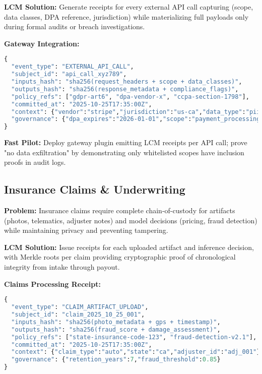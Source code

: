 \documentclass[12pt,a4paper]{article}
\begin{document}
\textbf{LCM Solution:} Generate receipts for every external API call capturing (scope, data classes, DPA reference, jurisdiction) while materializing full payloads only during formal audits or breach investigations.

\begin{technicalbox}
\textbf{Gateway Integration:}
\begin{lstlisting}[language=Python, caption=API Compliance Receipt]
{
  "event_type": "EXTERNAL_API_CALL",
  "subject_id": "api_call_xyz789",
  "inputs_hash": "sha256(request_headers + scope + data_classes)",
  "outputs_hash": "sha256(response_metadata + compliance_flags)",
  "policy_refs": ["gdpr-art6", "dpa-vendor-x", "ccpa-section-1798"],
  "committed_at": "2025-10-25T17:35:00Z",
  "context": {"vendor":"stripe","jurisdiction":"us-ca","data_type":"pii"},
  "governance": {"dpa_expires":"2026-01-01","scope":"payment_processing"}
}
\end{lstlisting}
\end{technicalbox}

\textbf{Fast Pilot:} Deploy gateway plugin emitting LCM receipts per API call; prove "no data exfiltration" by demonstrating only whitelisted scopes have inclusion proofs in audit logs.

\subsection{Insurance Claims \& Underwriting}

\textbf{Problem:} Insurance claims require complete chain-of-custody for artifacts (photos, telematics, adjuster notes) and model decisions (pricing, fraud detection) while maintaining privacy and preventing tampering.

\textbf{LCM Solution:} Issue receipts for each uploaded artifact and inference decision, with Merkle roots per claim providing cryptographic proof of chronological integrity from intake through payout.

\begin{technicalbox}
\textbf{Claims Processing Receipt:}
\begin{lstlisting}[language=Python, caption=Insurance Claims Receipt]
{
  "event_type": "CLAIM_ARTIFACT_UPLOAD",
  "subject_id": "claim_2025_10_25_001",
  "inputs_hash": "sha256(photo_metadata + gps + timestamp)",
  "outputs_hash": "sha256(fraud_score + damage_assessment)",
  "policy_refs": ["state-insurance-code-123", "fraud-detection-v2.1"],
  "committed_at": "2025-10-25T17:35:00Z",
  "context": {"claim_type":"auto","state":"ca","adjuster_id":"adj_001"},
  "governance": {"retention_years":7,"fraud_threshold":0.85}
}
\end{lstlisting}
\end{technicalbox}
\end{document}
